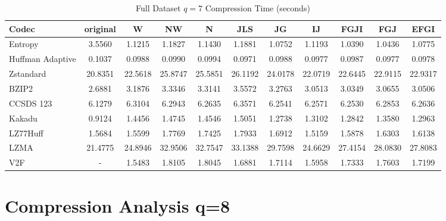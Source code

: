 \documentclass{article}
\begin{document}
\begin{table}[h!]
\centering
\caption{Full Dataset $q=7$ Compression Time (seconds)}
\begin{tabular}{|l|cccccccccc|}
\hline
Codec &  original &       W &      NW &       N &     JLS &      JG &      IJ &    FGJI &     FGJ &    EFGI \\
\hline
Entropy & 3.5560 & 1.1215 & 1.1827 & 1.1430 & 1.1881 & 1.0752 & 1.1193 & 1.0390 & 1.0436 & 1.0775         \\
\hline
Huffman Adaptive &    0.1037 &  0.0988 &  0.0990 &  0.0994 &  0.0971 &  0.0988 &  0.0977 &  0.0987 &  0.0977 &  0.0978 \\
Zstandard        &   20.8351 & 22.5618 & 25.8747 & 25.5851 & 26.1192 & 24.0178 & 22.0719 & 22.6445 & 22.9115 & 22.9317 \\
BZIP2            &    2.6881 &  3.1876 &  3.3346 &  3.3141 &  3.5572 &  3.2763 &  3.0513 &  3.0349 &  3.0655 &  3.0506 \\
CCSDS 123        &    6.1279 &  6.3104 &  6.2943 &  6.2635 &  6.3571 &  6.2541 &  6.2571 &  6.2530 &  6.2853 &  6.2636 \\
Kakadu           &    0.9124 &  1.4456 &  1.4745 &  1.4546 &  1.5051 &  1.2738 &  1.3102 &  1.2842 &  1.3580 &  1.2963 \\
LZ77Huff         &    1.5684 &  1.5599 &  1.7769 &  1.7425 &  1.7933 &  1.6912 &  1.5159 &  1.5878 &  1.6303 &  1.6138 \\
LZMA             &   21.4775 & 24.8946 & 32.9506 & 32.7547 & 33.1388 & 29.7598 & 24.6629 & 27.4154 & 28.0830 & 27.8083 \\
V2F              &    - &  1.5483 &  1.8105 &  1.8045 &  1.6881 &  1.7114 &  1.5958 &  1.7333 &  1.7603 &  1.7199 \\
\hline
\end{tabular}
\end{table}

\newpage
\section{Compression Analysis q=8}
\end{document}
